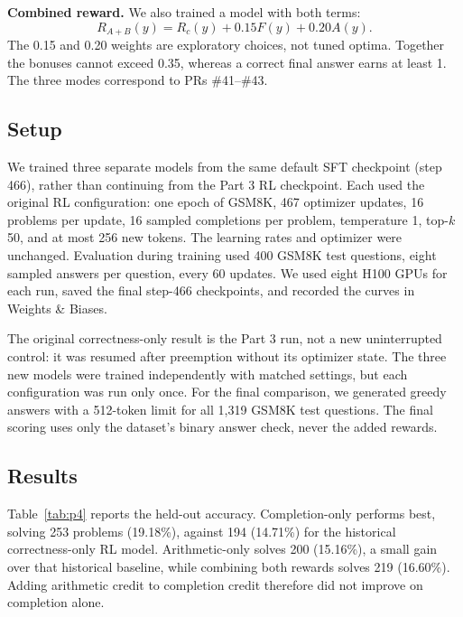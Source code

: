 \documentclass[10pt]{article}
\begin{document}
\textbf{Combined reward.} We also trained a model with both terms:
\[
R_{A+B}(y)=R_c(y)+0.15F(y)+0.20A(y).
\]
The 0.15 and 0.20 weights are exploratory choices, not tuned optima. Together the bonuses cannot exceed 0.35, whereas a correct final answer earns at least 1. The three modes correspond to PRs \#41--\#43.

\subsection*{Setup}
We trained three separate models from the same default SFT checkpoint (step 466), rather than continuing from the Part 3 RL checkpoint. Each used the original RL configuration: one epoch of GSM8K, 467 optimizer updates, 16 problems per update, 16 sampled completions per problem, temperature 1, top-$k$ 50, and at most 256 new tokens. The learning rates and optimizer were unchanged. Evaluation during training used 400 GSM8K test questions, eight sampled answers per question, every 60 updates. We used eight H100 GPUs for each run, saved the final step-466 checkpoints, and recorded the curves in Weights \& Biases.

The original correctness-only result is the Part 3 run, not a new uninterrupted control: it was resumed after preemption without its optimizer state. The three new models were trained independently with matched settings, but each configuration was run only once. For the final comparison, we generated greedy answers with a 512-token limit for all 1{,}319 GSM8K test questions. The final scoring uses only the dataset's binary answer check, never the added rewards.

\subsection*{Results}
Table~\ref{tab:p4} reports the held-out accuracy. Completion-only performs best, solving 253 problems (19.18\%), against 194 (14.71\%) for the historical correctness-only RL model. Arithmetic-only solves 200 (15.16\%), a small gain over that historical baseline, while combining both rewards solves 219 (16.60\%). Adding arithmetic credit to completion credit therefore did not improve on completion alone.
\end{document}
